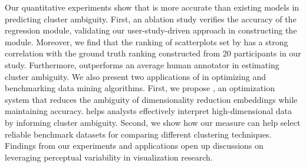 
Our quantitative experiments show that \measure is more accurate than existing models in predicting cluster ambiguity.
First, an ablation study verifies the accuracy of the regression module, validating our user-study-driven approach in constructing the module.
Moreover, we find that the ranking of scatterplots set by \measure has a strong correlation with the ground truth ranking constructed from 20 participants in our study.
Furthermore, \measure outperforms an average human annotator in estimating cluster ambiguity.
We also present two applications of \measure in optimizing and benchmarking data mining algorithms. 
First, we propose \ambreducer, an optimization system that reduces the ambiguity of dimensionality reduction embeddings while maintaining accuracy.
\ambreducer helps analysts effectively interpret high-dimensional data by informing cluster ambiguity. 
Second, we show how our measure can help select reliable benchmark datasets for  
comparing different clustering techniques. 
Findings from our experiments and applications open up discussions on leveraging perceptual variability in 
visualization research. 